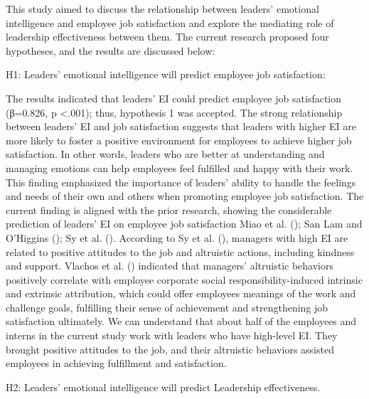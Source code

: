 \documentclass[
  man,
  longtable,
  nolmodern,
  notxfonts,
  notimes,
  colorlinks=true,linkcolor=blue,citecolor=blue,urlcolor=blue]{apa7}
\begin{document}
This study aimed to discuss the relationship between leaders' emotional
intelligence and employee job satisfaction and explore the mediating
role of leadership effectiveness between them. The current research
proposed four hypotheses, and the results are discussed below:

H1: Leaders' emotional intelligence will predict employee job
satisfaction:

The results indicated that leaders' EI could predict employee job
satisfaction (β=0.826, p \textless.001); thus, hypothesis 1 was
accepted. The strong relationship between leaders' EI and job
satisfaction suggests that leaders with higher EI are more likely to
foster a positive environment for employees to achieve higher job
satisfaction. In other words, leaders who are better at understanding
and managing emotions can help employees feel fulfilled and happy with
their work. This finding emphasized the importance of leaders' ability
to handle the feelings and needs of their own and others when promoting
employee job satisfaction. The current finding is aligned with the prior
research, showing the considerable prediction of leaders' EI on employee
job satisfaction Miao et al. (); San Lam
and O'Higgins (); Sy et al.
(). According to Sy et al.
(), managers with high EI are related to
positive attitudes to the job and altruistic actions, including kindness
and support. Vlachos et al. () indicated
that managers' altruistic behaviors positively correlate with employee
corporate social responsibility-induced intrinsic and extrinsic
attribution, which could offer employees meanings of the work and
challenge goals, fulfilling their sense of achievement and strengthening
job satisfaction ultimately. We can understand that about half of the
employees and interns in the current study work with leaders who have
high-level EI. They brought positive attitudes to the job, and their
altruistic behaviors assisted employees in achieving fulfillment and
satisfaction.

H2: Leaders' emotional intelligence will predict Leadership
effectiveness.
\end{document}
